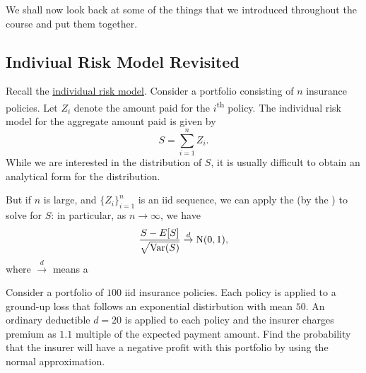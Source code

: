 \documentclass[notoc,notitlepage]{tufte-book}
\begin{document}

We shall now look back at some of the things that we introduced throughout the course and put them together.

\subsection{Indiviual Risk Model Revisited}%
\label{sub:indiviual_risk_model_revisited}

Recall the \hyperref[defn:individual_risk_model]{individual risk model}. Consider a portfolio consisting of $n$ insurance policies. Let $Z_i$  denote the amount paid for the $i$\textsuperscript{th} policy. The individual risk model for the aggregate amount paid is given by
\begin{equation*}
  S = \sum_{i=1}^{n} Z_i.
\end{equation*}
While we are interested in the distribution of $S$, it is usually difficult to obtain an analytical form for the distribution. 

But if $n$ is large, and $\{ Z_i \}_{i = 1}^{n}$ is an iid sequence, we can apply the  (by the ) to solve for $S$: in particular, as $n \to \infty$, we have
\begin{equation*}
  \frac{S - E [ S ]}{\sqrt{ \operatorname{Var}(S) }} \overset{d}{\to} \operatorname{N}(0, 1),
\end{equation*}
where $\overset{d}{\to}$ means a 

\begin{eg}
  Consider a portfolio of $100$ iid insurance policies. Each policy is applied to a ground-up loss that follows an exponential distirbution with mean $50$. An ordinary deductible $d = 20$ is applied to each policy and the insurer charges premium as $1.1$ multiple of the expected payment amount. Find the probability that the insurer will have a negative profit with this portfolio by using the normal approximation.
\end{eg}
\end{document}
